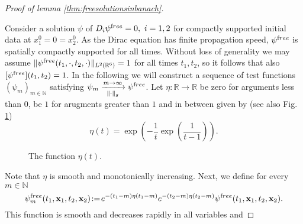 \documentclass[b5paper,draft,openbib,12pt]{memoir}
\newcommand{\vx}{\mathbf{x}}
\newcommand{\free}{{\textup free}}
\begin{document}
\begin{proof}[Proof of lemma \ref{thm:freesolutionsinbanach}]
\label{sec:freesolutionsinbanach}

Consider a solution $\psi$ of $D_i \psi^\free = 0,~i=1,2$ for 
compactly supported initial data at $x_1^0 = 0 = x_2^0$. As the 
Dirac equation has finite propagation speed, $\psi^\free$  is 
spatially compactly supported for all times. Without loss of 
generality we may assume 
\(\|\psi^\free (t_1,\cdot,t_2,\cdot)\|_{L^2(\mathbb{R}^6)}=1\) for 
all times \(t_1,t_2\), so it follows that also 
\([\psi^\free](t_1,t_2)=1\). In the following we will construct a 
sequence of test functions \((\psi_m)_{m\in\mathbb{N}}\) 
satisfying \(\psi_m \xrightarrow[\|\cdot\|_g ]{m\rightarrow \infty} 
\psi^\free\). Let \(\eta : \mathbb{R}\rightarrow \mathbb{R}\) be 
zero for arguments less than \(0\), be \(1\) for 
arugments greater than \(1\) and in 
between given by (see also Fig. \ref{fig:eta})
\begin{equation}
	\eta(t)=  \exp\left(-\frac{1}{t} \exp\left({\frac{1}{t-1}}\right)\right).
\end{equation}
%
\begin{figure}
	\centering
	\caption{The function \( \eta(t)\).}
	\label{fig:eta}
\end{figure}
%
 Note that $\eta$ is smooth and monotonically increasing. Next, we 
 define for every \(m\in\mathbb{N}\)
 \begin{equation}
 \psi^\free_m(t_1,\vx_1, t_2, \vx_2)\! :=\! e^{-(t_1-m) \eta(t_1-m) } e^{-(t_2-m) \eta(t_2-m)} \psi^\free(t_1,\vx_1, t_2, \vx_2).
 \end{equation}
 This function is smooth and decreases rapidly in all variables and 

\end{proof}
\end{document}
